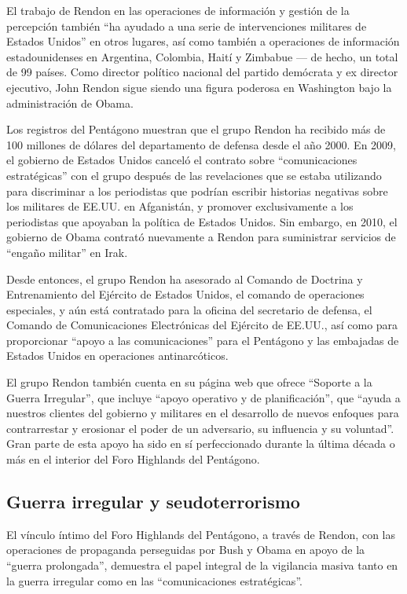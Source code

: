 \documentclass[10pt,a5paper,twoside,spanish,]{book}
\begin{document}
El trabajo de Rendon en las operaciones de información y gestión de la
percepción también ``ha ayudado a una serie de intervenciones militares
de Estados Unidos'' en otros lugares, así como también a operaciones de
información estadounidenses en Argentina, Colombia, Haití y Zimbabue ---
de hecho, un total de 99 países. Como director político nacional del
partido demócrata y ex director ejecutivo, John Rendon sigue siendo una
figura poderosa en Washington bajo la administración de Obama.

Los registros del Pentágono muestran que el grupo Rendon ha recibido más
de 100 millones de dólares del departamento de defensa desde el año
2000. En 2009, el gobierno de Estados Unidos canceló el contrato sobre
``comunicaciones estratégicas'' con el grupo después de las revelaciones
que se estaba utilizando para discriminar a los periodistas que podrían
escribir historias negativas sobre los militares de EE.UU. en
Afganistán, y promover exclusivamente a los periodistas que apoyaban la
política de Estados Unidos. Sin embargo, en 2010, el gobierno de Obama
contrató nuevamente a Rendon para suministrar servicios de ``engaño
militar'' en Irak.

Desde entonces, el grupo Rendon ha asesorado al Comando de Doctrina y
Entrenamiento del Ejército de Estados Unidos, el comando de operaciones
especiales, y aún está contratado para la oficina del secretario de
defensa, el Comando de Comunicaciones Electrónicas del Ejército de
EE.UU., así como para proporcionar ``apoyo a las comunicaciones'' para
el Pentágono y las embajadas de Estados Unidos en operaciones
antinarcóticos.

El grupo Rendon también cuenta en su página web que ofrece ``Soporte a
la Guerra Irregular'', que incluye ``apoyo operativo y de
planificación'', que ``ayuda a nuestros clientes del gobierno y
militares en el desarrollo de nuevos enfoques para contrarrestar y
erosionar el poder de un adversario, su influencia y su voluntad''. Gran
parte de esta apoyo ha sido en sí perfeccionado durante la última década
o más en el interior del Foro Highlands del Pentágono.

\subsection{Guerra irregular y
seudoterrorismo}\label{guerra-irregular-y-seudoterrorismo}

El vínculo íntimo del Foro Highlands del Pentágono, a través de Rendon,
con las operaciones de propaganda perseguidas por Bush y Obama en apoyo
de la ``guerra prolongada'', demuestra el papel integral de la
vigilancia masiva tanto en la guerra irregular como en las
``comunicaciones estratégicas''.
\end{document}
